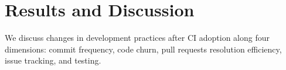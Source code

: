 
\section{Results and Discussion}
\label{sec:results}
We discuss changes in development practices after CI adoption along four 
dimensions: commit frequency, code churn, pull requests resolution efficiency,
issue tracking, and testing. 

%



